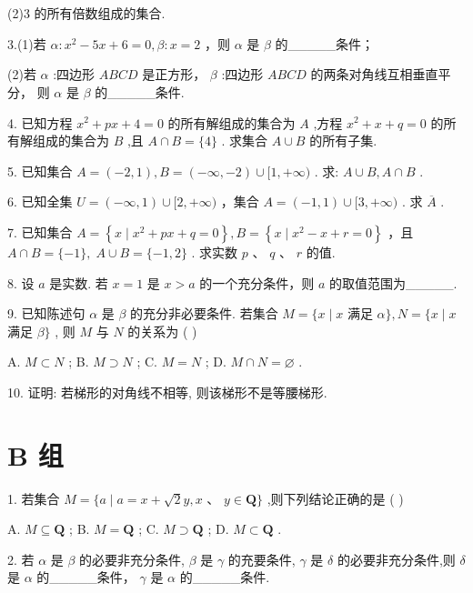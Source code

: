 \documentclass[10pt]{article}
\begin{document}
\section*{}

(2)3 的所有倍数组成的集合.

3.(1)若 \(\alpha  : {x}^{2} - {5x} + 6 = 0,\beta  : x = 2\) ，则 \(\alpha\) 是 \(\beta\) 的\_\_\_\_\_条件；

(2)若 \(\alpha\) :四边形 \({ABCD}\) 是正方形， \(\beta\) :四边形 \({ABCD}\) 的两条对角线互相垂直平分， 则 \(\alpha\) 是 \(\beta\) 的\_\_\_\_\_条件.

4. 已知方程 \({x}^{2} + {px} + 4 = 0\) 的所有解组成的集合为 \(A\) ,方程 \({x}^{2} + x + q = 0\) 的所有解组成的集合为 \(B\) ,且 \(A \cap  B = \{ 4\}\) . 求集合 \(A \cup  B\) 的所有子集.

5. 已知集合 \(A = \left( {-2,1}\right) ,B = \left( {-\infty , - 2}\right)  \cup  \lbrack 1, + \infty )\) . 求: \(A \cup  B,A \cap  B\) .

6. 已知全集 \(U = \left( {-\infty ,1}\right)  \cup  \lbrack 2, + \infty )\) ，集合 \(A = \left( {-1,1}\right)  \cup  \lbrack 3, + \infty )\) . 求 \(\overline{A}\) .

7. 已知集合 \(A = \left\{  {x \mid  {x}^{2} + {px} + q = 0}\right\}  ,B = \left\{  {x \mid  {x}^{2} - x + r = 0}\right\}\) ，且 \(A \cap  B = \{  - 1\} , \; A \cup  B = \{  - 1,2\}\) . 求实数 \(p\text{ 、 }q\text{ 、 }r\) 的值.

8. 设 \(a\) 是实数. 若 \(x = 1\) 是 \(x > a\) 的一个充分条件，则 \(a\) 的取值范围为\_\_\_\_\_.

9. 已知陈述句 \(\alpha\) 是 \(\beta\) 的充分非必要条件. 若集合 \(M = \{ x \mid  x\) 满足 \(\alpha \} ,N = \{ x \mid  x\) 满足 \(\beta \}\) , 则 \(M\) 与 \(N\) 的关系为 ( )

A. \(M \subset  N\) ; B. \(M \supset  N\) ; C. \(M = N\) ; D. \(M \cap  N = \varnothing\) .

10. 证明: 若梯形的对角线不相等, 则该梯形不是等腰梯形.

\section*{B 组}

1. 若集合 \(M = \{ a \mid  a = x + \sqrt{2}y,x\text{ 、 }y \in  \mathbf{Q}\}\) ,则下列结论正确的是 ( )

A. \(M \subseteq  \mathbf{Q}\) ; B. \(M = \mathbf{Q}\) ; C. \(M \supset  \mathbf{Q}\) ; D. \(M \subset  \mathbf{Q}\) .

2. 若 \(\alpha\) 是 \(\beta\) 的必要非充分条件, \(\beta\) 是 \(\gamma\) 的充要条件, \(\gamma\) 是 \(\delta\) 的必要非充分条件,则 \(\delta\) 是 \(\alpha\) 的\_\_\_\_\_条件， \(\gamma\) 是 \(\alpha\) 的\_\_\_\_\_条件.
\end{document}
